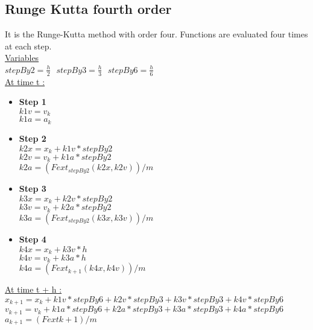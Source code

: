 \documentclass[12pt]{article}
\begin{document}
\begin{doublespace}
\subsection{Runge Kutta fourth order}
It is the Runge-Kutta method with order four. Functions are evaluated four times at each step.
\\  \underline{Variables}
\\$stepBy2 = \frac{h}{2}$  $       $ $stepBy3 = \frac{h}{3}$ $       $  $stepBy6 = \frac{h}{6}$
\\ \underline{At time t :}
\begin{itemize}
\item \textbf{Step 1}
\\$k1v = v_{k}$
\\$k1a = a_{k}$
\item \textbf{Step 2}
\\$k2x = x_{k} + k1v*stepBy2$
\\$k2v  = v_{k} + k1a*stepBy2$
\\$k2a  = (Fext_{stepBy2}(k2x,k2v))/m$
\item \textbf{Step 3}
\\$k3x  = x_{k} + k2v * stepBy2$
\\$k3v  = v_{k} + k2a * stepBy2$
\\$k3a  = (Fext_{stepBy2}(k3x,k3v))/m$
\item \textbf{Step 4}
\\ $ k4x  = x_{k} + k3v * h $
\\ $ k4v  = v_{k} + k3a * h $
\\ $ k4a  = (Fext_{k+1}(k4x,k4v))/m $
\end{itemize}
 \underline{At time t + h :}
\\$x_{k+1} = x_{k} + k1v * stepBy6 + k2v * stepBy3 + k3v * stepBy3 + k4v * stepBy6$
\\$v_{k+1} = v_{k} + k1a * stepBy6 + k2a * stepBy3 + k3a * stepBy3 + k4a * stepBy6$
\\$a_{k+1} = (Fext{k+1})/m$


\end{doublespace}
\end{document}
